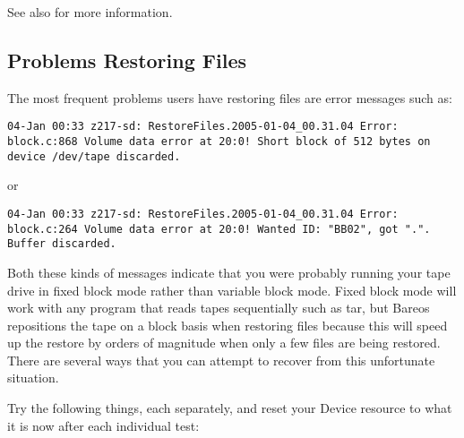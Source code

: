   See also  for more information.


\subsection{Problems Restoring Files}


The most frequent problems users have restoring files are error messages such
as:

\footnotesize
\begin{verbatim}
04-Jan 00:33 z217-sd: RestoreFiles.2005-01-04_00.31.04 Error:
block.c:868 Volume data error at 20:0! Short block of 512 bytes on
device /dev/tape discarded.
\end{verbatim}
\normalsize

or

\footnotesize
\begin{verbatim}
04-Jan 00:33 z217-sd: RestoreFiles.2005-01-04_00.31.04 Error:
block.c:264 Volume data error at 20:0! Wanted ID: "BB02", got ".".
Buffer discarded.
\end{verbatim}
\normalsize

Both these kinds of messages indicate that you were probably running your tape
drive in fixed block mode rather than variable block mode. Fixed block mode
will work with any program that reads tapes sequentially such as tar, but
Bareos repositions the tape on a block basis when restoring files because this
will speed up the restore by orders of magnitude when only a few files are being
restored. There are several ways that you can attempt to recover from this
unfortunate situation.

Try the following things, each separately, and reset your Device resource to
what it is now after each individual test:

